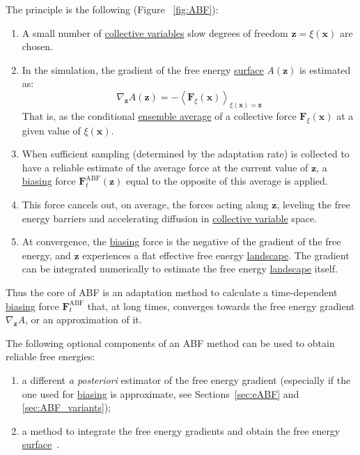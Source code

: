 \documentclass[9pt,review]{livecoms}
\newcommand{\vx}{\mathbf{x}}
\newcommand{\vz}{\mathbf{z}}
\newcommand{\vF}{\mathbf{F}}
\begin{document}
The principle is the following (Figure ~\ref{fig:ABF}):
\begin{enumerate}
 \item A small number of \hyperlink{ref:CV} {collective variables} slow degrees of freedom $\vz=\xi(\vx)$  are chosen.
 \item In the simulation, the gradient of the free energy \hyperlink{ref:FES} {surface} $A(\vz)$  is estimated as:
\begin{equation}
    \nabla_\vz A(\vz) = - \left\langle \vF_\xi(\vx)  \right\rangle_{\xi(\vx) = \vz}
\end{equation}
That is, as the conditional \hyperlink{ref:ensemble_average} {ensemble average} of a collective force $\vF_\xi(\vx)$ at a given value of $\xi(\vx)$.
 \item When sufficient sampling (determined by the adaptation rate) is collected to have a reliable estimate of the average force at the current value of $\vz$, a \hyperlink{ref:biasingE} {biasing} force $\vF^\mathrm{ABF}_t(\vz)$ equal to the opposite of this average is applied.
 \item This force cancels out, on average, the forces acting along $\vz$, leveling the free energy barriers and accelerating diffusion in \hyperlink{ref:CV} {collective variable} space.
 \item At convergence, the \hyperlink{ref:biasingE} {biasing} force is the negative of the gradient of the free energy, and $\vz$ experiences a flat effective free energy \hyperlink{ref:FES} {landscape}. The gradient can be integrated numerically to estimate the free energy \hyperlink{ref:FES} {landscape} itself.
\end{enumerate}

Thus the core of ABF is an adaptation method to calculate a time-dependent \hyperlink{ref:biasingE} {biasing} force $\vF^\mathrm{ABF}_t$ that, at long times, converges towards the free energy gradient $\nabla_\vz A$, or an approximation of it.

The following optional components of an ABF method can be used to obtain reliable free energies:
\begin{enumerate}
\item a different \textit{a posteriori} estimator of the free energy gradient (especially if the one used for \hyperlink{ref:biasingE} {biasing} is approximate, see Sections~\ref{sec:eABF} and \ref{sec:ABF_variants});
\item a method to integrate the free energy gradients and obtain the free energy \hyperlink{ref:FES} {surface}~\cite{Henin2021integration}.
\end{enumerate}
\end{document}
